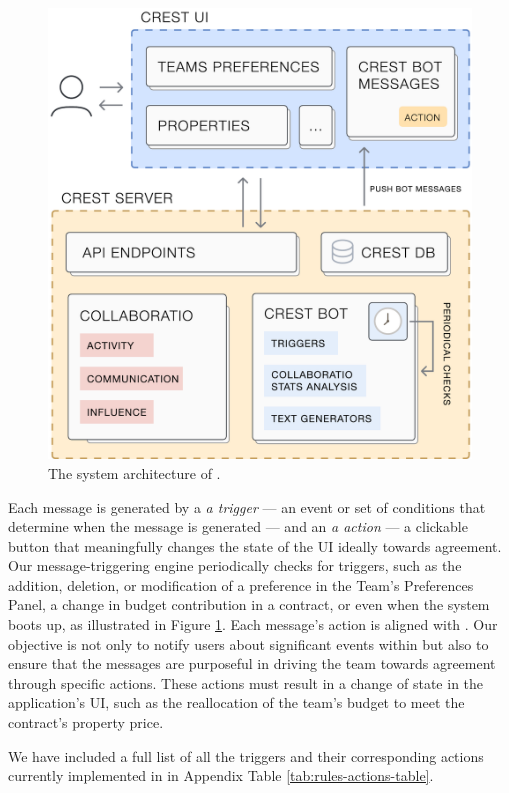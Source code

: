 \begin{figure}
    \includegraphics[width=1\linewidth]{images/crest-architecture.pdf}
    \caption{The system architecture of \tool.}
    \label{fig:crest-architecture}
\end{figure}



Each \cbot message is generated by a \textit{a trigger} --- an event or set of conditions that determine when the \cbot message is generated --- and an \textit{a action} --- a clickable button that meaningfully changes the state of the UI ideally towards agreement. Our \cbot message-triggering engine periodically checks for triggers, such as the addition, deletion, or modification of a preference in the Team's Preferences Panel, a change in budget contribution in a contract, or even when the system boots up, as illustrated in Figure \ref{fig:crest-architecture}. Each message's action is aligned  with \pGoalCenteredFlow. Our objective is not only to notify users about significant events within \tool but also to ensure that the messages are purposeful in driving the team towards agreement through specific actions. These actions must result in a change of state in the application's UI, such as the reallocation of the team's budget to meet the contract's property price.

We have included a full list of all the triggers and their corresponding actions currently implemented in \tool in Appendix Table \ref{tab:rules-actions-table}.